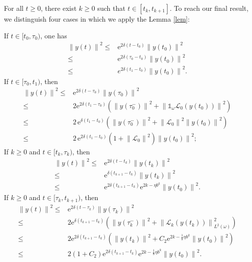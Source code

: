 \documentclass[sn-mathphys]{sn-jnl}
\begin{document}
For all $t\geq 0$, there exist $k\geq 0$ such that $t \in [t_{k}, t_{k+1}]$. To reach our final result, we distinguish four cases in which we apply the Lemma \ref{lem}:

\noindent If $t \in [t_{0},\tau_{0})$, one has
\begin{align}
     \left\|y\left(t\right)\right\|^{2}
     \leq &\mathrm{e}^{2\delta(t-t_0)} \left\|y\left(t_{0}\right)\right\|^{2}\nonumber\\
     \leq &\mathrm{e}^{2\delta(\tau_0-t_0)} \left\|y\left(t_{0}\right)\right\|^{2}\nonumber\\
     \leq &e^{2\delta (t_1-t_0)} \left\|y\left(t_{0}\right)\right\|^{2}.
\end{align}
If $t \in [\tau_{0}, t_{1})$, then
\begin{align}
 \left\|y\left(t\right)\right\|^{2} 
 \leq &\mathrm{e}^{2\delta (t-\tau_0)} \left\|y\left(\tau_{0}\right)\right\|^{2}\nonumber\\
 \leq &2 \mathrm{e}^{2\delta (t_1-\tau_0)} \left(\left\|y\left(\tau_{0}^{-}\right)\right\|^{2} +\left\|\mathds{1}_{\omega} \mathcal{L}_{0}(y(t_{0})) \right\|^{2}\right)\nonumber\\
 \leq &2 \,\mathrm{e}^{\delta(t_1-t_0)} \left(\left\|y\left(\tau_{0}^{-}\right)\right\|^{2} + \left\| \mathcal{L}_{0}\right\|^{2} \left\| y(t_{0})\right\|^{2}\right)\nonumber\\
 \leq &2\,\mathrm{e}^{2\delta(t_1-t_0)}  \left(1 + \left\| \mathcal{L}_{0} \right\|^{2} \right) \left\|y\left(t_{0}\right)\right\|^{2};
\end{align}
If $k \geq 0$ and $t \in [t_{k},\tau_{k})$, then
\begin{align*}
     \left\|y\left(t\right)\right\|^{2} 
     \leq &\mathrm{e}^{2\delta (t-t_k)} \left\|y\left(t_{k}\right)\right\|^{2}\\
     \leq &\mathrm{e}^{\delta (t_{k+1}-t_k)} \left\|y\left(t_{k}\right)\right\|^{2}\\
     \leq &\mathrm{e}^{2\delta (t_{k+1}-t_k)}\mathrm{e}^{2k- \eta b^{ k}} \left\|y\left(t_{0}\right)\right\|^{2}.
\end{align*}
If $k \geq 0$ and $t \in [\tau_{k}, t_{k+1})$, then
\begin{align}\label{equ54}
 \left\|y\left(t\right)\right\|^{2} 
 \leq &\mathrm{e}^{2\delta (t-\tau_k)} \left\|y\left(\tau_{k}\right)\right\|^{2}\nonumber\\
 \leq &2\mathrm{e}^{\delta (t_{k+1}-t_k)} \left( \left\|y\left(\tau_{k}^{-}\right)\right\|^{2} + \left\| \mathcal{L}_{k}(y(t_{k})) \right\|^{2}_{L^2(\omega)} \right)\nonumber\\
 \leq &2\mathrm{e}^{2\delta (t_{k+1}-t_k)} \left( \left\|y\left(t_k\right)\right\|^{2} + C_2\mathrm{e}^{2k- \frac{1}{8}\eta b^{ k}} \left\|y\left(t_{0}\right)\right\|^{2}\right)\nonumber\\
 \leq &2 \left(1+C_2 \right)\mathrm{e}^{2\delta (t_{k+1}-t_k)}\mathrm{e}^{2k- \frac{1}{8}\eta b^{ k}} \left\|y\left(t_{0}\right)\right\|^{2}.
\end{align}
\end{document}
